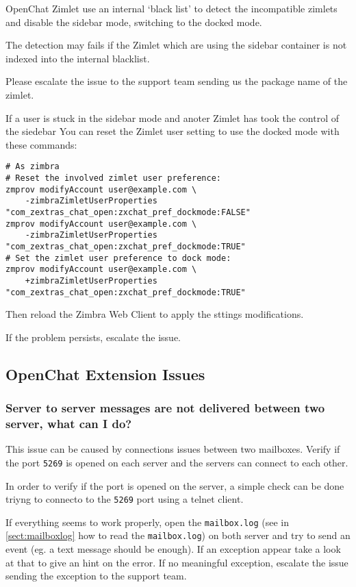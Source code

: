         OpenChat Zimlet use an internal `black list' to detect the incompatible zimlets and disable the sidebar mode, switching
        to the docked mode.

        The detection may fails if the Zimlet which are using the sidebar container is not indexed into the internal
        blacklist.

        Please escalate the issue to the support team sending us the package name of the zimlet.

        If a user is stuck in the sidebar mode and anoter Zimlet has took the control of the siedebar You can reset the
        Zimlet user setting to use the docked mode with these commands:
        \begin{verbatim}
# As zimbra
# Reset the involved zimlet user preference:
zmprov modifyAccount user@example.com \
    -zimbraZimletUserProperties "com_zextras_chat_open:zxchat_pref_dockmode:FALSE"
zmprov modifyAccount user@example.com \
    -zimbraZimletUserProperties "com_zextras_chat_open:zxchat_pref_dockmode:TRUE"
# Set the zimlet user preference to dock mode:
zmprov modifyAccount user@example.com \
    +zimbraZimletUserProperties "com_zextras_chat_open:zxchat_pref_dockmode:TRUE"
        \end{verbatim}

        Then reload the Zimbra Web Client to apply the sttings modifications.

        If the problem persists, escalate the issue.

    \subsection[Extension Issues]{OpenChat Extension Issues}

    \subsubsection{Server to server messages are not delivered between two server, what can I do?}
        This issue can be caused by connections issues between two mailboxes. Verify if the port \verb+5269+ is opened on
        each server and the servers can connect to each other.

        In order to verify if the port is opened on the server, a simple check can be done triyng to connecto to the \verb+5269+
        port using a telnet client.

        If everything seems to work properly, open the \verb+mailbox.log+ (see in \autoref{sect:mailboxlog} how to read
        the \verb+mailbox.log+) on both server and try to send an event (eg. a text message should be enough). If an
        exception appear take a look at that to give an hint on the error. If no meaningful exception, escalate the issue
        sending the exception to the support team.

